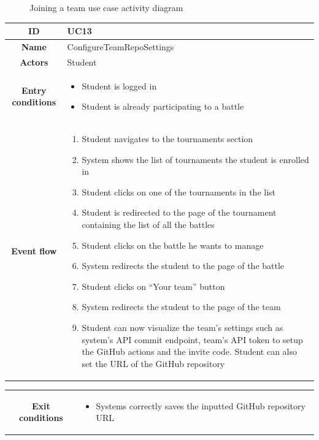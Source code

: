 \begin{center}
\begin{figure}[H]
        \caption{Joining a team use case activity diagram}
    \end{figure}
    \begin{tabular}{ |c|m{10cm}| }
        \hline
        \textbf{ID} & UC13 \\
        \hline
        \textbf{Name} & ConfigureTeamRepoSettings \\
        \hline
        \textbf{Actors} & Student \\
        \hline
        \textbf{Entry conditions} &
        \begin{itemize}
            \item Student is logged in
            \item Student is already participating to a battle
        \end{itemize} \\
        \hline
        \textbf{Event flow} &
        \begin{enumerate}
            \item Student navigates to the tournaments section
            \item System shows the list of tournaments the student is enrolled in
            \item Student clicks on one of the tournaments in the list
            \item Student is redirected to the page of the tournament containing the list of all the battles
            \item Student clicks on the battle he wants to manage
            \item System redirects the student to the page of the battle
            \item Student clicks on “Your team” button
            \item System redirects the student to the page of the team
            \item Student can now visualize the team’s settings such as system’s API commit endpoint, team’s API token to setup the GitHub actions and the invite code. Student can also set the URL of the GitHub repository
        \end{enumerate} \\
        \hline
    \end{tabular}
    \newpage
    \begin{tabular}{ |c|m{10cm}| }
        \hline
        \textbf{Exit conditions} &
        \begin{itemize}
            \item Systems correctly saves the inputted GitHub repository URL

\end{itemize}
\end{tabular}
\end{center}
